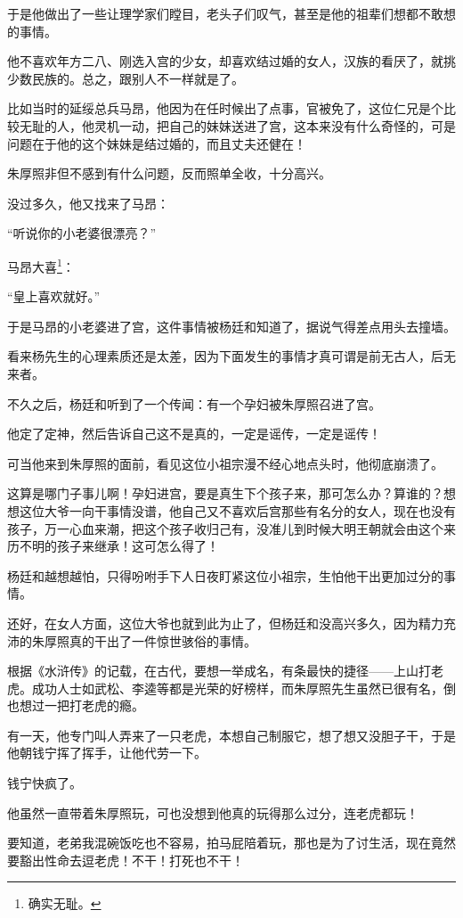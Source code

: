 \begin{multicols}{\theparacolNo}
于是他做出了一些让理学家们瞠目，老头子们叹气，甚至是他的祖辈们想都不敢想的事情。

他不喜欢年方二八、刚选入宫的少女，却喜欢结过婚的女人，汉族的看厌了，就挑少数民族的。总之，跟别人不一样就是了。

比如当时的延绥总兵马昂，他因为在任时候出了点事，官被免了，这位仁兄是个比较无耻的人，他灵机一动，把自己的妹妹送进了宫，这本来没有什么奇怪的，可是问题在于他的这个妹妹是结过婚的，而且丈夫还健在！

朱厚照非但不感到有什么问题，反而照单全收，十分高兴。

没过多久，他又找来了马昂：

“听说你的小老婆很漂亮？”

马昂大喜\footnote{确实无耻。}：

“皇上喜欢就好。”

于是马昂的小老婆进了宫，这件事情被杨廷和知道了，据说气得差点用头去撞墙。

看来杨先生的心理素质还是太差，因为下面发生的事情才真可谓是前无古人，后无来者。

不久之后，杨廷和听到了一个传闻：有一个孕妇被朱厚照召进了宫。

他定了定神，然后告诉自己这不是真的，一定是谣传，一定是谣传！

可当他来到朱厚照的面前，看见这位小祖宗漫不经心地点头时，他彻底崩溃了。

这算是哪门子事儿啊！孕妇进宫，要是真生下个孩子来，那可怎么办？算谁的？想想这位大爷一向干事情没谱，他自己又不喜欢后宫那些有名分的女人，现在也没有孩子，万一心血来潮，把这个孩子收归己有，没准儿到时候大明王朝就会由这个来历不明的孩子来继承！这可怎么得了！

杨廷和越想越怕，只得吩咐手下人日夜盯紧这位小祖宗，生怕他干出更加过分的事情。

还好，在女人方面，这位大爷也就到此为止了，但杨廷和没高兴多久，因为精力充沛的朱厚照真的干出了一件惊世骇俗的事情。

根据《水浒传》的记载，在古代，要想一举成名，有条最快的捷径——上山打老虎。成功人士如武松、李逵等都是光荣的好榜样，而朱厚照先生虽然已很有名，倒也想过一把打老虎的瘾。

有一天，他专门叫人弄来了一只老虎，本想自己制服它，想了想又没胆子干，于是他朝钱宁挥了挥手，让他代劳一下。

钱宁快疯了。

他虽然一直带着朱厚照玩，可也没想到他真的玩得那么过分，连老虎都玩！

要知道，老弟我混碗饭吃也不容易，拍马屁陪着玩，那也是为了讨生活，现在竟然要豁出性命去逗老虎！不干！打死也不干！


\end{multicols}
